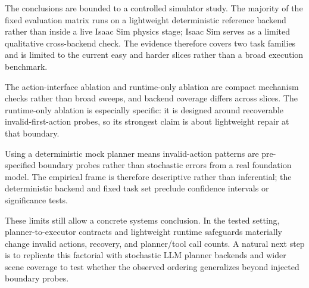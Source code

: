The conclusions are bounded to a controlled simulator study. The majority of
the fixed evaluation matrix runs on a lightweight deterministic reference
backend rather than inside a live Isaac Sim physics stage; Isaac Sim serves as a limited qualitative cross-backend check. The
evidence therefore covers two task families and is limited to the current easy
and harder slices rather than a broad execution benchmark.

The action-interface ablation and runtime-only ablation are compact mechanism
checks rather than broad sweeps, and backend coverage differs across slices.
The runtime-only ablation is especially specific: it is designed around
recoverable invalid-first-action probes, so its strongest claim is about
lightweight repair at that boundary.

Using a deterministic mock planner means invalid-action patterns are
pre-specified boundary probes rather than stochastic errors from a real
foundation model. The empirical frame is therefore descriptive rather than
inferential; the deterministic backend and fixed task set preclude confidence
intervals or significance tests.

These limits still allow a concrete systems conclusion. In the tested setting,
planner-to-executor contracts and lightweight runtime safeguards materially
change invalid actions, recovery, and planner/tool call counts.
A natural next step is to replicate this factorial with stochastic LLM
planner backends and wider scene coverage to test whether the observed
ordering generalizes beyond injected boundary probes.
